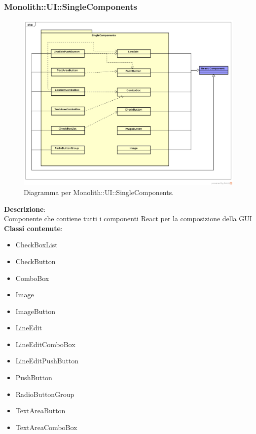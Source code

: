 \subsubsection{Monolith::UI::SingleComponents}
   \FloatBarrier
   \begin{figure}[ht]
   \centering
\includegraphics[width=\textwidth,keepaspectratio]{img/UI-SingleComponents}
   \caption{Diagramma per Monolith::UI::SingleComponents.}
\end{figure}
\FloatBarrier
\textbf{Descrizione}:\\
 Componente che contiene tutti i componenti React per la composizione della GUI 
\\ \textbf{Classi contenute}:\\
\begin{itemize}
\item CheckBoxList
\item CheckButton
\item ComboBox
\item Image
\item ImageButton
\item LineEdit
\item LineEditComboBox
\item LineEditPushButton
\item PushButton
\item RadioButtonGroup
\item TextAreaButton
\item TextAreaComboBox
\end{itemize}


\clearpage

